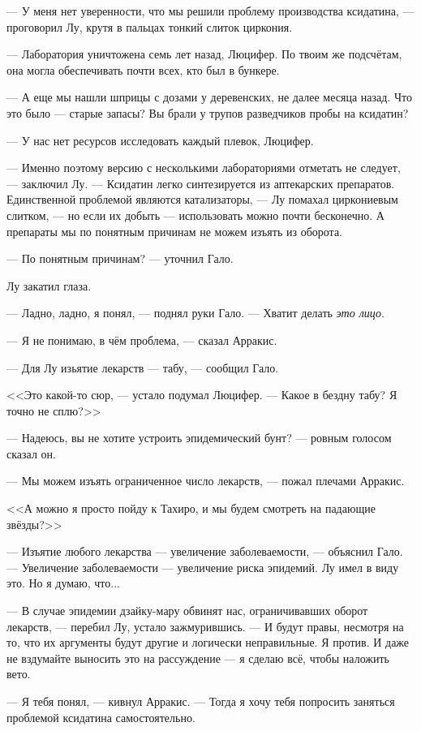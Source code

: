 --- У меня нет уверенности, что мы решили проблему производства ксидатина, --- проговорил Лу, крутя в пальцах тонкий слиток циркония.

--- Лаборатория уничтожена семь лет назад, Люцифер.
По твоим же подсчётам, она могла обеспечивать почти всех, кто был в бункере.

--- А еще мы нашли шприцы с дозами у деревенских, не далее месяца назад.
Что это было --- старые запасы?
Вы брали у трупов разведчиков пробы на ксидатин?

--- У нас нет ресурсов исследовать каждый плевок, Люцифер.

--- Именно поэтому версию с несколькими лабораториями отметать не следует, --- заключил Лу.
--- Ксидатин легко синтезируется из аптекарских препаратов.
Единственной проблемой являются катализаторы, --- Лу помахал циркониевым слитком, --- но если их добыть --- использовать можно почти бесконечно.
А препараты мы по понятным причинам не можем изъять из оборота.

--- По понятным причинам? --- уточнил Гало.

Лу закатил глаза.

--- Ладно, ладно, я понял, --- поднял руки Гало.
--- Хватит делать \emph{это лицо}.

--- Я не понимаю, в чём проблема, --- сказал Арракис.

--- Для Лу изьятие лекарств --- табу, --- сообщил Гало.

<<Это какой-то сюр, --- устало подумал Люцифер.
--- Какое в бездну табу?
Я точно не сплю?>>

--- Надеюсь, вы не хотите устроить эпидемический бунт? --- ровным голосом сказал он.

--- Мы можем изъять ограниченное число лекарств, --- пожал плечами Арракис.

<<А можно я просто пойду к Тахиро, и мы будем смотреть на падающие звёзды?>>

--- Изъятие любого лекарства --- увеличение заболеваемости, --- объяснил Гало.
--- Увеличение заболеваемости --- увеличение риска эпидемий.
Лу имел в виду это.
Но я думаю, что...

--- В случае эпидемии дзайку-мару обвинят нас, ограничивавших оборот лекарств, --- перебил Лу, устало зажмурившись.
--- И будут правы, несмотря на то, что их аргументы будут другие и логически неправильные.
Я против.
И даже не вздумайте выносить это на рассуждение --- я сделаю всё, чтобы наложить вето.

--- Я тебя понял, --- кивнул Арракис.
--- Тогда я хочу тебя попросить заняться проблемой ксидатина самостоятельно.

